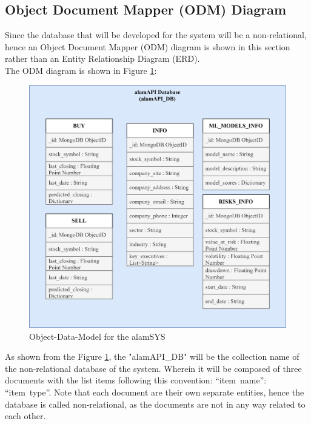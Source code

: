 \subsection{Object Document Mapper (ODM) Diagram}
\label{subsec:odm_subsec}
Since the database that will be developed for the system will be 
a non-relational, hence an Object Document Mapper (ODM) 
diagram is shown in this section rather than an Entity Relationship Diagram (ERD).
\hfill \\

The ODM diagram is shown in Figure \ref{fig:odm}:
\begin{figure}[ht]
    \centering
    \includegraphics[width=1\textwidth]{./assets/Chapter_3/ODM.png}
    \caption{Object-Data-Model for the alamSYS}
    \label{fig:odm}
\end{figure}
\FloatBarrier
As shown from the Figure \ref{fig:odm}, the "alamAPI\_DB" will be the collection
name of the non-relational database of the system. Wherein it 
will be composed of three documents with the list items following this convention: 
“item\ name”: “item\ type”. 
Note that each document are their own separate entities, 
hence the database is called non-relational, as the documents are not in 
any way related to each other.
\hfill \\

